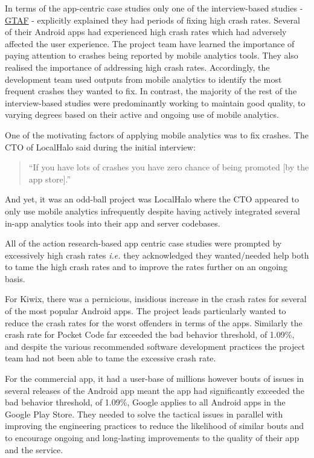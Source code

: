 In terms of the app-centric case studies only one of the interview-based studies - \href{glossary-gtaf}{GTAF} - explicitly explained they had periods of fixing high crash rates. Several of their Android apps had experienced high crash rates which had adversely affected the user experience. The project team have learned the importance of paying attention to crashes being reported by mobile analytics tools. They also realised the importance of addressing high crash rates. Accordingly, the development team used outputs from mobile analytics to identify the most frequent crashes they wanted to fix. In contrast, the majority of the rest of the interview-based studies were predominantly working to maintain good quality, to varying degrees based on their active and ongoing use of mobile analytics.

One of the motivating factors of applying mobile analytics was to fix crashes. The CTO of LocalHalo said during the initial interview: 

\begin{quote}
    ``If you have lots of crashes you have zero chance of being promoted [by the app store].''
\end{quote}

And yet, it was an odd-ball project was LocalHalo where the CTO appeared to only use mobile analytics infrequently despite having actively integrated several in-app analytics tools into their app and server codebases.

All of the action research-based app centric case studies were prompted by excessively high crash rates \emph{i.e.} they acknowledged they wanted/needed help both to tame the high crash rates and to improve the rates further on an ongoing basis.

For Kiwix, there was a pernicious, insidious increase in the crash rates for several of the most popular Android apps. The project leads particularly wanted to reduce the crash rates for the worst offenders in terms of the apps. Similarly the crash rate for Pocket Code far exceeded the bad behavior threshold, of 1.09\%, and despite the various recommended software development practices the project team had not been able to tame the excessive crash rate.

For the commercial app, it had a user-base of millions however bouts of issues in several releases of the Android app meant the app had significantly exceeded the bad behavior threshold, of 1.09\%, Google applies to all Android apps in the Google Play Store. They needed to solve the tactical issues in parallel with improving the engineering practices to reduce the likelihood of similar bouts and to encourage ongoing and long-lasting improvements to the quality of their app and the service. 

